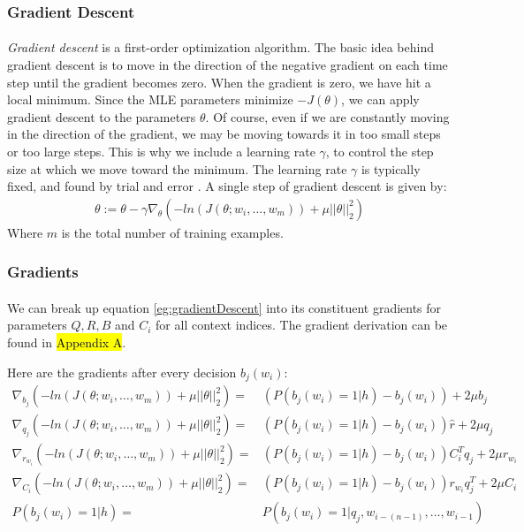 \subsubsection{Gradient Descent}
\paragraph{}
\emph{Gradient descent} is a first-order optimization algorithm. The basic idea behind gradient descent is to move in the direction of the negative gradient on each time step until the gradient becomes zero. When the gradient is zero, we have hit a local minimum. Since the MLE parameters minimize $-J(\theta)$, we can apply gradient descent to the parameters $\theta$. Of course, even if we are constantly moving in the direction of the gradient, we may be moving towards it in too small steps or too large steps. This is why we include a learning rate $\gamma$, to control the step size at which we move toward the minimum. The learning rate $\gamma$ is typically fixed, and found by trial and error \cite{Elkan2013}.
A single step of gradient descent is given by:
\begin{align}
\theta := \theta - \gamma \nabla_\theta \left( -ln(J(\theta;w_i,\dots, w_m)) +  \mu ||\theta||^2_2 \right) \label{eg:gradientDescent} 
\end{align}
Where $m$ is the total number of training examples.

\subsubsection{Gradients}
\paragraph{}
We can break up equation \ref{eg:gradientDescent} into its constituent gradients for parameters $Q,R,B$ and $C_i$ for all context indices. The gradient derivation can be found in \hl{Appendix A}.

Here are the gradients after every decision $b_j(w_i)$:
\begin{align}
\nabla_{b_j} \left( -ln(J(\theta;w_i,\dots, w_m)) +  \mu ||\theta||^2_2 \right)  = &  \left( P \left(b_j(w_i) = 1 | h \right) - b_j(w_i) \right) +2\mu b_j  \label{eq:gradients}
\\
\nabla_{q_j} \left( -ln(J(\theta;w_i,\dots, w_m)) +  \mu ||\theta||^2_2 \right)  = &\left( P \left(b_j(w_i) = 1 | h \right) - b_j(w_i) \right)\hat{r} +2\mu q_j \nonumber
\\
\nabla_{r_{w_i}} \left( -ln(J(\theta;w_i,\dots, w_m)) +  \mu ||\theta||^2_2 \right)  = & \left( P \left(b_j(w_i) = 1 | h \right) - b_j(w_i)\right) C_i^T q_j   +2\mu r_{w_i} \nonumber
\\
\nabla_{C_i} \left( -ln(J(\theta;w_i,\dots, w_m)) +  \mu ||\theta||^2_2 \right)  = &\left( P \left(b_j(w_i) = 1 | h \right) - b_j(w_i) \right) r_{w_i}q_j^T  +2\mu C_i \nonumber
\\
P \left(b_j(w_i) = 1 | h \right)= & P \left(b_j(w_i) = 1 | q_j, w_{i-(n-1)},\dots, w_{i-1} \right) \nonumber
\end{align}

